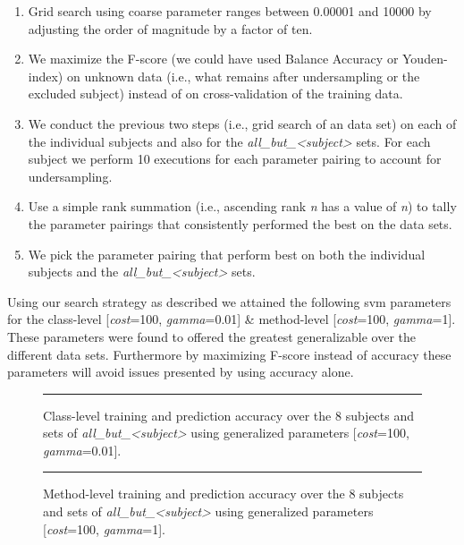 \begin{enumerate}
  \item Grid search using coarse parameter ranges between 0.00001 and 10000 by adjusting the order of magnitude by a factor of ten.
  \item We maximize the F-score (we could have used Balance Accuracy or Youden-index) on unknown data (i.e., what remains after undersampling or the excluded subject) instead of on cross-validation of the training data.
  \item We conduct the previous two steps (i.e., grid search of an data set) on each of the individual subjects and also for the \emph{all\_but\_<subject>} sets. For each subject we perform 10 executions for each parameter pairing to account for  undersampling.
  \item Use a simple rank summation (i.e., ascending rank \emph{n} has a value of \emph{n}) to tally the parameter pairings that consistently performed the best on the data sets.
  \item We pick the parameter pairing that perform best on both the individual subjects and the \emph{all\_but\_<subject>} sets.
\end{enumerate}

Using our search strategy as described we attained the following \gls{svm} parameters for the class-level [\emph{cost}=100, \emph{gamma}=0.01] \& method-level [\emph{cost}=100, \emph{gamma}=1]. These parameters were found to offered the greatest generalizable over the different data sets. Furthermore by maximizing F-score instead of accuracy these parameters will avoid issues presented by using accuracy alone.

\begin{figure}[!tb]
  \centering
  \begin{adjustbox}{max size={.95\textwidth}{.95\textheight}}
    
  \end{adjustbox}
  \caption{Class-level training and prediction accuracy over the 8 subjects and sets of \emph{all\_but\_<subject>} using generalized parameters [\emph{cost}=100, \emph{gamma}=0.01].}
  \vspace{2mm}
  \hrule
  \label{fig:prediction_with_parameters_class_graph}
\end{figure}

\begin{figure}[!tb]
  \centering
  \begin{adjustbox}{max size={.95\textwidth}{.95\textheight}}
    
  \end{adjustbox}
  \caption{Method-level training and prediction accuracy over the 8 subjects and sets of \emph{all\_but\_<subject>} using generalized parameters [\emph{cost}=100, \emph{gamma}=1].}
  \vspace{2mm}
  \hrule
  \label{fig:prediction_with_parameters_method_graph}
\end{figure}

